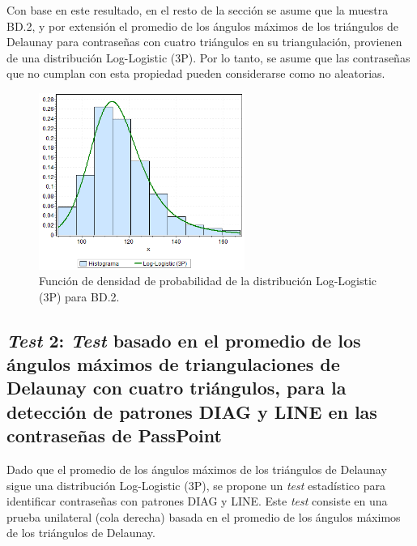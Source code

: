 \documentclass[12pt]{report}
\begin{document}
Con base en este resultado, en el resto de la sección se asume que la muestra BD.2, y por extensión el promedio de los ángulos máximos de los triángulos de Delaunay para contraseñas con cuatro triángulos en su triangulación, provienen de una distribución Log-Logistic (3P). Por lo tanto, se asume que las contraseñas que no cumplan con esta propiedad pueden considerarse como no aleatorias.
 
\begin{figure}[ht]
	\centering
	
	\includegraphics[width=0.6\textwidth]{4td_fdp.png}
	\caption{Función de densidad de probabilidad de la  distribución Log-Logistic (3P) para BD.2.}
	\label{4TD_FDP}
\end{figure}
\newpage

\subsection{\textit{Test} 2: \textit{Test} basado en el promedio de los ángulos máximos de triangulaciones de Delaunay con cuatro triángulos, para la detección de patrones DIAG y LINE en las contraseñas de PassPoint}
\label{sec:2.2}

Dado que el promedio de los ángulos máximos de los triángulos de Delaunay sigue una distribución Log-Logistic (3P), se propone un \textit{test} estadístico para identificar contraseñas con patrones DIAG y LINE. Este \textit{test} consiste en una prueba unilateral (cola derecha) basada en el promedio de los ángulos máximos de los triángulos de Delaunay.
\end{document}
